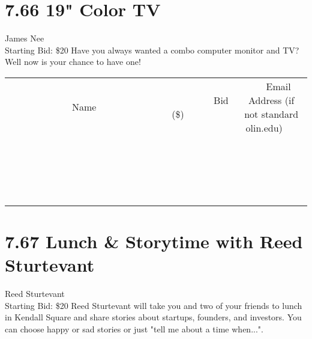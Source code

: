 \documentclass[11pt]{article}
\begin{document}
\section*{7.66 19" Color TV}
James Nee
\\
Starting Bid: \$20
\newline
Have you always wanted a combo computer monitor and TV? Well now is your chance to have one!
\\[3ex]
\begin{tabular}{c c c}
~~~~~~~~~~~~~Name~~~~~~~~~~~~~ & ~~~~~~~~~Bid (\$)~~~~~~~~~  & ~~~Email Address (if not standard olin.edu)~~~\\
 & & \\
\hline
 & & \\
\hline
 & & \\
\hline
 & & \\
\hline
 & & \\
\hline
 & & \\
\hline
 & & \\
\hline
 & & \\
\hline
 & & \\
\hline
 & & \\
\hline
 & & \\
\hline
 & & \\
\hline
 & & \\
\hline
 & & \\
\hline
 & & \\
\hline
 & & \\
\hline
 & & \\
\hline
 & & \\
\hline
 & & \\
\hline
\end{tabular}
\newpage
\section*{7.67 Lunch \& Storytime with Reed Sturtevant}
Reed Sturtevant
\\
Starting Bid: \$20
\newline
Reed Sturtevant will take you and two of your friends to lunch in Kendall Square and share stories about startups, founders, and investors.  You can choose happy or sad stories or just "tell me about a time when...".
\end{document}
